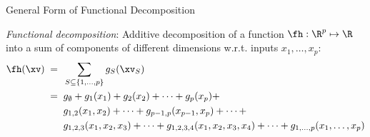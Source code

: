 \documentclass[11pt,compress,t,notes=noshow, aspectratio=169, xcolor=table]{beamer}
\newcommand{\open}{}
\newcommand{\close}{}
\begin{document}
\begin{frame}{General Form of Functional Decomposition
}


\begin{definition}
\textit{Functional decomposition}: Additive decomposition of a function $\fh: \R^p \mapsto \R$ into a sum of components of different dimensions w.r.t. inputs $x_1, \ldots, x_p$: 
\begin{equation*}
\begin{split}
\fh(\xv)
\; = \; \; & \sum_{S \subseteq \{1,\ldots,p\}} g_{S}(\xv_S) \\
\; = \; \; & g_{\open \emptyset \close} +
g_{\open 1 \close}(x_1) + g_{\open 2 \close}(x_2) + \dots + g_{\open p \close}(x_p) + \\
& g_{\open 1, 2 \close}(x_1, x_2) + \dots + g_{\open p-1, p \close}(x_{p-1}, x_p) + \dots + \\
& g_{\open 1, 2, 3 \close}(x_1, x_2, x_3) + \dots +
g_{\open 1, 2, 3, 4 \close}(x_1, x_2, x_3, x_4) + \dots +
g_{\open 1,\ldots,p \close}(x_1, \ldots, x_p)
\end{split}    
\end{equation*}

\end{definition}
\end{frame}
\end{document}
